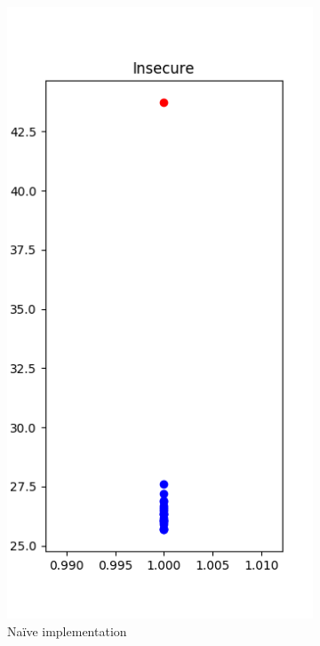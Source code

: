 \begin{figure}[h]
\centering
\begin{subfigure}{.5\textwidth}
  \centering
  \includegraphics[width=.7\linewidth]{figures/insecure0.png}
  \caption{Na\"ive implementation}
  \label{fig:sub1}
\end{subfigure}%
\begin{subfigure}{.5\textwidth}
  \centering

\end{subfigure}
\end{figure}

